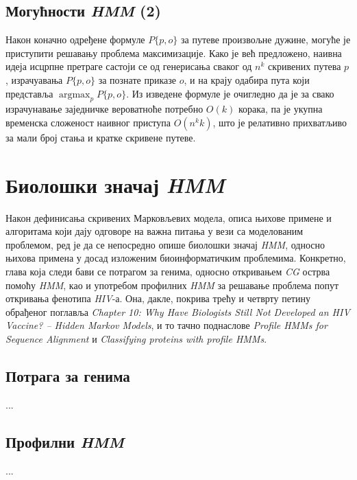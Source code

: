 \documentclass[12pt,oneside]{memoir}
\begin{document}
\begin{CJK}{UTF8}{ipxm}
\section{Могућности \textit{HMM} (2)}
Након коначно одређене формуле $P\{p, o\}$ за путеве произвољне дужине, могуће је приступити решавању проблема максимизације. Како је већ предложено, наивна идеја исцрпне претраге састоји се од генерисања сваког од $n^k$ скривених путева $p$, израчуавања $P\{p, o\}$ за познате приказе $o$, и на крају одабира пута који представља $\operatorname*{argmax}_p P\{p, o\}$. Из изведене формуле је очигледно да је за свако израчунавање заједничке вероватноће потребно $O(k)$ корака, па је укупна временска сложеност наивног приступа $O(n^kk)$, што је релативно прихватљиво за мали број стања и кратке скривене путеве.

\chapter{Биолошки значај \textit{HMM}}
Након дефинисања скривених Марковљевих модела, описа њихове примене и алгоритама који дају одговоре на важна питања у вези са моделованим проблемом, ред је да се непосредно опише биолошки значај \textit{HMM}, односно њихова примена у досад изложеним биоинформатичким проблемима. Конкретно, глава која следи бави се потрагом за генима, односно откривањем \textit{CG} острва помоћу \textit{HMM}, као и употребом профилних \textit{HMM} за решавање проблема попут откривања фенотипа \textit{HIV}-а. Она, дакле, покрива трећу и четврту петину обрађеног поглавља \textit{Chapter 10: Why Have Biologists Still Not Developed an HIV Vaccine? -- Hidden Markov Models}, и то тачно поднаслове \textit{Profile HMMs for Sequence Alignment} и \textit{Classifying proteins with profile HMMs}.

\section{Потрага за генима}
...

\section{Профилни \textit{HMM}}
...


\end{CJK}
\end{document}
